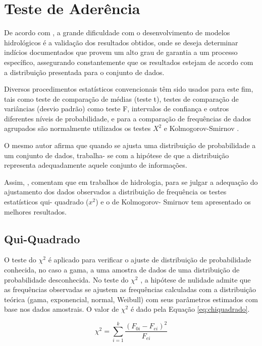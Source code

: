 \section{Teste de Aderência}

De acordo com , a grande dificuldade com o desenvolvimento de modelos hidrológicos é a validação dos resultados obtidos, onde se deseja determinar indícios documentados que provem um alto grau de garantia a um processo específico, assegurando constantemente que os resultados estejam de acordo com a distribuição presentada para o conjunto de dados.

Diversos procedimentos estatísticos convencionais têm sido usados para este fim, tais como teste de comparação de médias (teste t), testes de comparação de variâncias (desvio padrão) como teste F, intervalos de confiança e outros diferentes níveis de probabilidade, e para a comparação de frequências de dados agrupados são normalmente utilizados os testes $X^2$ e Kolmogorov-Smirnov \cite{oliveira}.

O mesmo autor afirma que quando se ajusta uma distribuição de probabilidade a um conjunto de dados, trabalha- se com a hipótese de que a distribuição representa adequadamente aquele conjunto de informações.

Assim, , comentam que em trabalhos de hidrologia, para se julgar a adequação do ajustamento dos dados observados a distribuição de frequência os testes estatísticos qui- quadrado ($x^2$) e o de Kolmogorov- Smirnov tem apresentado os melhores resultados.

\subsection{Qui-Quadrado}

O teste do $\chi^2$ é aplicado para verificar o ajuste de distribuição de probabilidade conhecida, no caso a gama, a uma amostra de dados de uma distribuição de probabilidade desconhecida. No teste do $\chi^2$ , a hipótese de nulidade admite que as frequências observadas se ajustem as frequências calculadas com a distribuição teórica (gama, exponencial, normal, Weibull) com seus parâmetros estimados com base nos dados amostrais. O valor de $\chi^2$ é dado pela Equação \ref{eq:chiquadrado}.

\begin{equation}[h]
\label{eq:chiquadrado}
    \chi^2=\sum_{i=1}^{k} \frac{(F_{0i}-F_{ei})^2}{F_{ei}}
\end{equation}

